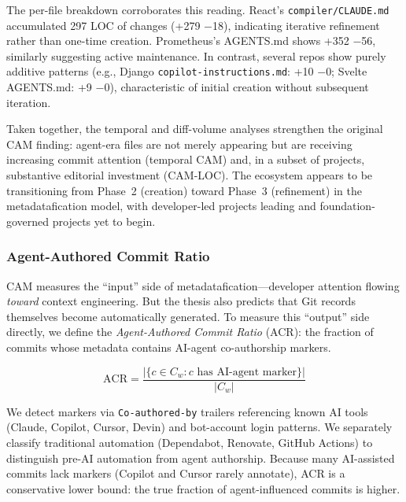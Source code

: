 \documentclass[12pt]{article}
\begin{document}
The per-file breakdown corroborates this reading. React's \texttt{compiler/CLAUDE.md} accumulated 297 LOC of changes (+279 $-$18), indicating iterative refinement rather than one-time creation. Prometheus's AGENTS.md shows +352 $-$56, similarly suggesting active maintenance. In contrast, several repos show purely additive patterns (e.g., Django \texttt{copilot-instructions.md}: +10 $-$0; Svelte AGENTS.md: +9 $-$0), characteristic of initial creation without subsequent iteration.

Taken together, the temporal and diff-volume analyses strengthen the original CAM finding: agent-era files are not merely appearing but are receiving increasing commit attention (temporal CAM) and, in a subset of projects, substantive editorial investment (CAM-LOC). The ecosystem appears to be transitioning from Phase~2 (creation) toward Phase~3 (refinement) in the metadatafication model, with developer-led projects leading and foundation-governed projects yet to begin.

\subsubsection{Agent-Authored Commit Ratio}

CAM measures the ``input'' side of metadatafication---developer attention flowing \textit{toward} context engineering. But the thesis also predicts that Git records themselves become automatically generated. To measure this ``output'' side directly, we define the \textit{Agent-Authored Commit Ratio} (ACR): the fraction of commits whose metadata contains AI-agent co-authorship markers.

\begin{equation}
\text{ACR} = \frac{|\{c \in C_w : c \text{ has AI-agent marker}\}|}{|C_w|}
\end{equation}

\noindent We detect markers via \texttt{Co-authored-by} trailers referencing known AI tools (Claude, Copilot, Cursor, Devin) and bot-account login patterns. We separately classify traditional automation (Dependabot, Renovate, GitHub Actions) to distinguish pre-AI automation from agent authorship. Because many AI-assisted commits lack markers (Copilot and Cursor rarely annotate), ACR is a conservative lower bound: the true fraction of agent-influenced commits is higher.
\end{document}
